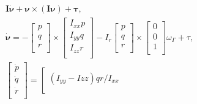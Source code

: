 \documentclass[11pt]{exam}
\begin{document}
        \begin{equation}
            \begin{gathered}
                \boldsymbol{I\dot{\nu}} + \boldsymbol{\nu}\times(\boldsymbol{I\nu}) + \boldsymbol{\tau}, \\
                \boldsymbol{\dot{\nu}} = -
                \left[{
                    \begin{array}{c}
                        p \\
                        q \\
                        r \\
                    \end{array} 
                }\right] \times 
                \left[{
                    \begin{array}{c}
                        I_{xx}p \\
                        I_{yy}q \\
                        I_{zz}r \\
                    \end{array} 
                }\right] - I_r
                \left[{
                    \begin{array}{c}
                        p \\
                        q \\
                        r \\
                    \end{array} 
                }\right] \times 
                \left[{
                    \begin{array}{c}
                        0 \\
                        0 \\
                        1 \\
                    \end{array} 
                }\right] \omega_{\Gamma} + \tau, \\
                \left[{
                    \begin{array}{c}
                        \dot{p} \\
                        \dot{q} \\
                        \dot{r} \\
                    \end{array} 
                }\right] = 
                \left[{
                    \begin{array}{c}
                        (I_{yy} - I{zz})qr/I_{xx} \\

\end{array}}
\end{gathered}
\end{equation}
\end{document}
